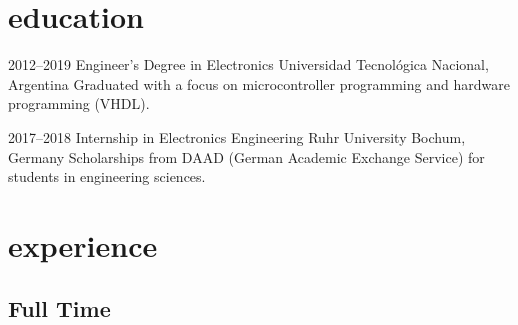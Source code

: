 \documentclass[a4paper,nocolors]{cv-friggeri-x}
\begin{document}

\section{education}

\begin{entrylist}


\entry
{2012--2019}
{Engineer’s Degree {\normalfont in Electronics}}
{Universidad Tecnológica Nacional, Argentina}
{Graduated with a focus on microcontroller programming and hardware programming (VHDL).}


\entry
{2017--2018}
{Internship {\normalfont in Electronics Engineering}}
{Ruhr University Bochum, Germany}
{Scholarships from DAAD (German Academic Exchange Service) for students in engineering sciences.}

\end{entrylist}


\section{experience}

\subsection{Full Time}
\end{document}
